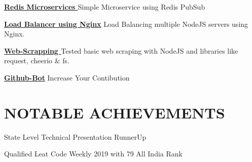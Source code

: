 \documentclass[]{deedy-resume-openfont}
\begin{document}
\begin{minipage}[t]{0.66\textwidth}
\runsubsection \textbf{\href{https://github.com/aawezk786/redis-microservices/}{Redis Microservices }}
\sectionsep
Simple Microservice using Redis PubSub
\sectionsep

\runsubsection \textbf{\href{https://github.com/aawezk786/nginx-load-balancing-nodejs}
{Load Balancer using Nginx}}
\sectionsep
Load Balancing multiple NodeJS servers using Nginx.
\sectionsep

\runsubsection \textbf{\href{https://github.com/aawezk786/Web-Scrapping-NodeJs/}
{Web-Scrapping }}
\sectionsep
Tested basic web scraping with NodeJS and libraries like request, cheerio & fs.
\sectionsep

\runsubsection \textbf{\href{https://github.com/aawezk786/github-bot/}
{Github-Bot}}
\sectionsep
Increase Your Contibution 
\sectionsep

\section{NOTABLE ACHIEVEMENTS}
\sectionsep
State Level Technical Presentation RunnerUp
\\
\sectionsep

Qualified Leat Code Weekly 2019 with 79 All India Rank
\\


\end{minipage} 
\end{document}
